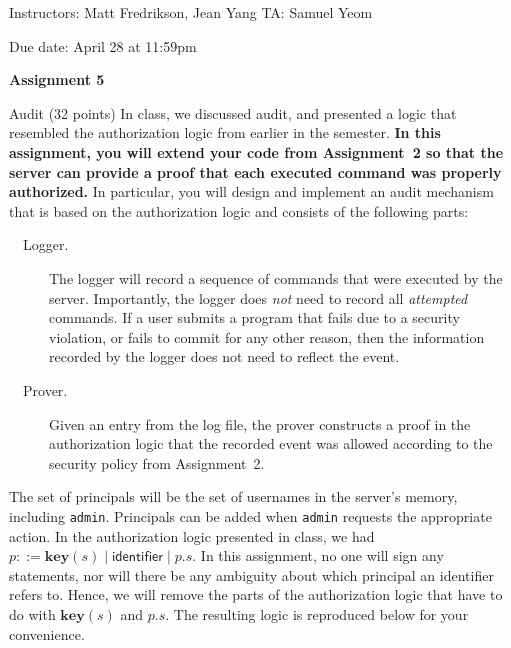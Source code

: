 \documentclass[11pt]{article}
\newcommand*{\stuname}{}
\newcommand*{\assignmentnumb}{5}
\newcommand{\key}{\ensuremath{\mathbf{key}}\xspace}
\begin{document}
\centerline{Instructors: Matt Fredrikson, Jean Yang \hfill TA: Samuel Yeom} 
\vspace{0.5ex}
Due date: April 28 at 11:59pm \\
\vspace{1.5ex}
\centerline{\Large\bf Assignment \assignmentnumb}
\vspace{0.5ex}
\centerline{\Large\bf \stuname}

\begin{problem}{Audit (32 points)}
In class, we discussed audit, and presented a logic that resembled the authorization logic from earlier in the semester. \textbf{In this assignment, you will extend your code from Assignment~2 so that the server can provide a proof that each executed command was properly authorized.} In particular, you will design and implement an audit mechanism that is based on the authorization logic and consists of the following parts:
\begin{description}
\item[\ \ Logger.] The logger will record a sequence of commands that were executed by the server. Importantly, the logger does \emph{not} need to record all \emph{attempted} commands. If a user submits a program that fails due to a security violation, or fails to commit for any other reason, then the information recorded by the logger does not need to reflect the event.
\item[\ \ Prover.] Given an entry from the log file, the prover constructs a proof in the authorization logic that the recorded event was allowed according to the security policy from Assignment~2.
\end{description}

The set of principals will be the set of usernames in the server's memory, including \texttt{admin}. Principals can be added when \texttt{admin} requests the appropriate action. In the authorization logic presented in class, we had $p ::= \key(s) \mid \mathsf{identifier} \mid p.s$. In this assignment, no one will sign any statements, nor will there be any ambiguity about which principal an identifier refers to. Hence, we will remove the parts of the authorization logic that have to do with $\key(s)$ and $p.s$. The resulting logic is reproduced below for your convenience.


\end{problem}
\end{document}
